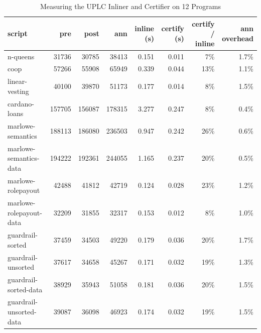\begin{table}
\caption{Measuring the UPLC Inliner and Certifier on 12 Programs}
\label{tab:inline-eval}
\centering
\small
\begin{tabular}{@{}lrrrrrrr@{}}
\toprule
script & pre & post & ann & inline (s) & certify (s) & certify / inline & ann overhead \\
\midrule
n-queens                &  31736 &  30785 &  38413 & 0.151 & 0.011 & 7\% & 1.7\% \\
coop                    &  57266 &  55908 &  65949 & 0.339 & 0.044 & 13\% & 1.1\% \\
linear-vesting          &  40100 &  39870 &  51173 & 0.177 & 0.014 & 8\% & 1.5\% \\
cardano-loans           & 157705 & 156087 & 178315 & 3.277 & 0.247 & 8\% & 0.4\% \\
marlowe-semantics       & 188113 & 186080 & 236503 & 0.947 & 0.242 & 26\% & 0.6\% \\
marlowe-semantics-data  & 194222 & 192361 & 244055 & 1.165 & 0.237 & 20\% & 0.5\% \\
marlowe-rolepayout      &  42488 &  41812 &  42719 & 0.124 & 0.028 & 23\% & 1.2\% \\
marlowe-rolepayout-data &  32209 &  31855 &  32317 & 0.153 & 0.012 & 8\% & 1.0\% \\
guardrail-sorted        &  37459 &  34503 &  49220 & 0.179 & 0.036 & 20\% & 1.7\% \\
guardrail-unsorted      &  37617 &  34658 &  45267 & 0.171 & 0.032 & 19\% & 1.3\% \\
guardrail-sorted-data   &  38929 &  35943 &  51058 & 0.181 & 0.036 & 20\% & 1.5\% \\
guardrail-unsorted-data &  39087 &  36098 &  46923 & 0.174 & 0.032 & 19\% & 1.5\% \\
\bottomrule
\end{tabular}
\end{table}
